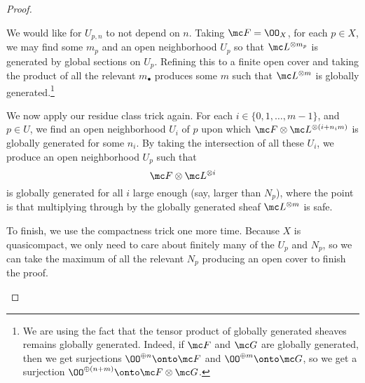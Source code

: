 \documentclass[../notes.tex]{subfiles}
\begin{document}
\begin{proof}
\begin{itemize}
		We would like for $U_{p,n}$ to not depend on $n$. Taking $\mc F=\OO_X$, for each $p\in X$, we may find some $m_p$ and an open neighborhood $U_p$ so that $\mc L^{\otimes m_p}$ is generated by global sections on $U_p$. Refining this to a finite open cover and taking the product of all the relevant $m_\bullet$ produces some $m$ such that $\mc L^{\otimes m}$ is globally generated.\footnote{We are using the fact that the tensor product of globally generated sheaves remains globally generated. Indeed, if $\mc F$ and $\mc G$ are globally generated, then we get surjections $\OO^{\oplus n}\onto\mc F$ and $\OO^{\oplus m}\onto\mc G$, so we get a surjection $\OO^{\oplus(n+m)}\onto\mc F\otimes\mc G$.}

		We now apply our residue class trick again. For each $i\in\{0,1,\ldots,m-1\}$, and $p\in U$, we find an open neighborhood $U_{i}$ of $p$ upon which $\mc F\otimes\mc L^{\otimes(i+n_im)}$ is globally generated for some $n_i$. By taking the intersection of all these $U_i$, we produce an open neighborhood $U_p$ such that
		\[\mc F\otimes\mc L^{\otimes i}\]
		is globally generated for all $i$ large enough (say, larger than $N_p$), where the point is that multiplying through by the globally generated sheaf $\mc L^{\otimes m}$ is safe.

		To finish, we use the compactness trick one more time. Because $X$ is quasicompact, we only need to care about finitely many of the $U_p$ and $N_p$, so we can take the maximum of all the relevant $N_p$ producing an open cover to finish the proof.
		\qedhere
	\end{itemize}
\end{proof}
\end{document}
